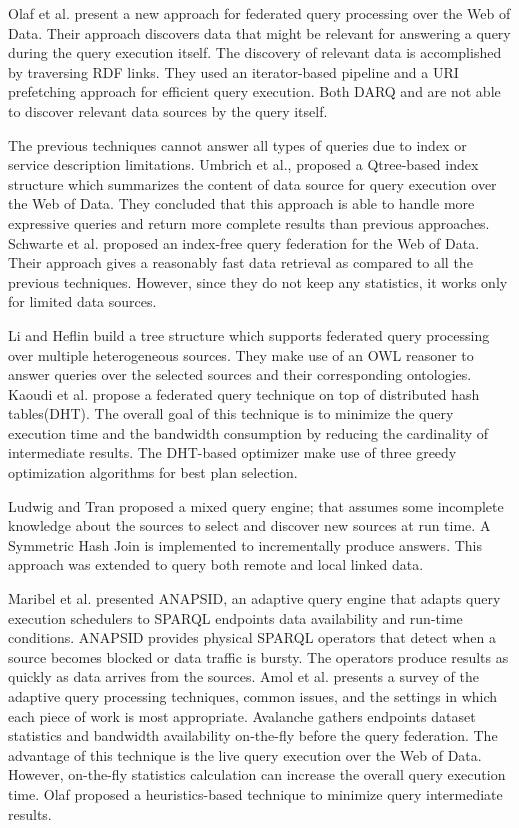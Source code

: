 \documentclass{sig-alternate}  %
\begin{document}
Olaf et al.\cite{key-4} present a new approach for federated query processing
over the Web of Data. Their approach discovers data that might be
relevant for answering a query during the query execution itself.
The discovery of relevant data is accomplished by traversing RDF links.
They used an iterator-based pipeline and a URI prefetching approach
for efficient query execution. Both DARQ and \cite{key-3} are not able
to discover relevant data sources by the query itself.

The previous techniques cannot answer all types of queries due to
index or service description limitations. Umbrich et al.\cite{key-5},
\cite{key-6} proposed a Qtree-based index structure which summarizes the
content of data source for query execution over the Web of Data. They
concluded that this approach is able to handle more expressive queries
and return more complete results than previous approaches. Schwarte
et al.\cite{key-7} proposed an index-free query federation for the Web
of Data. Their approach gives a reasonably fast data retrieval as
compared to all the previous techniques. However, since they do not
keep any statistics, it works only for limited data sources.

Li and Heflin\cite{key-15} build a tree structure which supports federated query processing over multiple heterogeneous sources. They make use of an OWL reasoner to answer queries
over the selected sources and their corresponding ontologies. Kaoudi et al.\cite{key-16}
propose a federated query technique on top of distributed hash tables(DHT). 
 The overall goal of this technique is to minimize the query execution time and the bandwidth
consumption by reducing the cardinality of intermediate results. The DHT-based optimizer make use of three greedy optimization algorithms for best plan selection.  

Ludwig and Tran\cite{key-18} proposed a mixed
query engine; that assumes some incomplete knowledge about the sources to select and discover new sources at run time. A Symmetric Hash Join
is implemented to incrementally produce answers. This approach
was extended to query both remote and local linked data\cite{key-19}.

Maribel et al.\cite{key-21} presented ANAPSID, an adaptive query engine
that adapts query execution schedulers to SPARQL endpoints data
availability and run-time conditions. ANAPSID provides physical SPARQL
operators that detect when a source becomes blocked or data traffic
is bursty. The operators produce results as
quickly as data arrives from the sources. Amol et al.\cite{key-17} presents a survey of the adaptive query processing
techniques, common issues, and the settings in which each piece of work is most appropriate. 
Avalanche\cite{key-24} gathers endpoints dataset statistics and bandwidth availability on-the-fly before the query federation. The advantage of this technique is the live query execution over the Web of Data. However, on-the-fly statistics calculation can increase the overall query execution time. Olaf\cite{key-25} proposed a heuristics-based technique to minimize query intermediate
results. 
\end{document}
